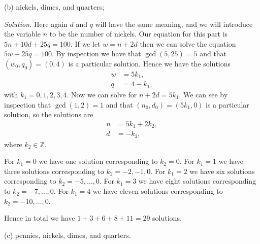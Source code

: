 \documentclass{article}
\newcommand{\Z}{\mathbb{Z}}
\begin{document}
\vspace{5mm}

(b) nickels, dimes, and quarters;

\textit{Solution.}
Here again $d$ and $q$ will have the same meaning, and we will introduce
the variable $n$ to be the number of nickels. Our equation for this part
is $5n + 10d + 25q = 100$. If we let $w = n + 2 d$ then we can solve the
equation $5w + 25q = 100$. By inspection we have that $\gcd(5, 25) = 5$
and that $(w_0, q_0) = (0, 4)$ is a particular solution. Hence we have
the solutions
%
\begin{align*}
    w &= 5 k_1, \\
    q &= 4 - k_1
    ,
\end{align*}
%
with $k_1 = 0, 1, 2, 3, 4$. Now we can solve for $n + 2 d = 5 k_1$. We
can see by inspection that $\gcd(1, 2) = 1$ and that
$(n_0, d_0) = (5k_1, 0)$ is a particular solution, so the solutions are
%
\begin{align*}
    n &= 5 k_1  + 2 k_2, \\
    d &= - k_2
    ,
\end{align*}
%
where $k_2 \in \Z$.

For $k_1 = 0$ we have one solution corresponding to $k_2 = 0$.
For $k_1 = 1$ we have three solutions corresponding to
$k_2 = -2, -1, 0$. For $k_1 = 2$ we have six solutions corresponding to
$k_2 = -5, \ldots, 0$. For $k_1 = 3$ we have eight solutions corresponding to
$k_2 = -7, \ldots, 0$. For $k_1 = 4$ we have eleven solutions corresponding to
$k_2 = -10, \ldots, 0$.

Hence in total we have $1 + 3 + 6 + 8 + 11 = 29$ solutions.

\vspace{5mm}

(c) pennies, nickels, dimes, and quarters.
\end{document}
